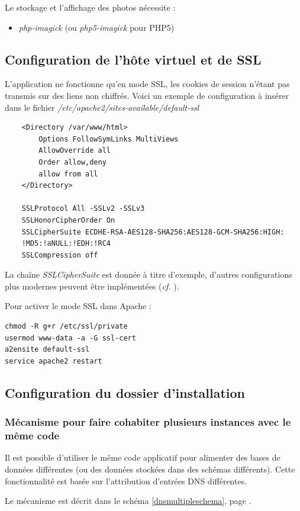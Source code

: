 Le stockage et l'affichage des photos nécessite :
\begin{itemize}
\item \textit{php-imagick} (ou \textit{php5-imagick} pour PHP5)
\end{itemize}

\subsection{Configuration de l'hôte virtuel et de SSL}
L'application ne fonctionne qu'en mode SSL, les cookies de session n'étant pas transmis sur des liens non chiffrés. Voici un exemple de configuration à insérer dans le fichier \textit{/etc/apache2/sites-available/default-ssl}
\begin{lstlisting}
    <Directory /var/www/html>
        Options FollowSymLinks MultiViews
        AllowOverride all
        Order allow,deny
        allow from all
    </Directory>

    SSLProtocol All -SSLv2 -SSLv3
    SSLHonorCipherOrder On
    SSLCipherSuite ECDHE-RSA-AES128-SHA256:AES128-GCM-SHA256:HIGH:
    !MD5:!aNULL:!EDH:!RC4
    SSLCompression off
\end{lstlisting}

La chaîne \textit{SSLCipherSuite} est donnée à titre d'exemple, d'autres configurations plus modernes peuvent être implémentées (\textit{cf.} \cite{tls}).

Pour activer le mode SSL dans Apache :
\begin{lstlisting}
chmod -R g+r /etc/ssl/private
usermod www-data -a -G ssl-cert
a2ensite default-ssl
service apache2 restart
\end{lstlisting}


\subsection{Configuration du dossier d'installation}

\subsubsection{Mécanisme pour faire cohabiter plusieurs instances avec le même code}
\label{dnsmultiple}
Il est possible d'utiliser le même code applicatif pour alimenter des bases de données différentes (ou des données stockées dans des schémas différents). Cette fonctionnalité est basée sur l'attribution d'entrées DNS différentes. 

Le mécanisme est décrit dans le schéma \ref{dnsmultipleschema}, page \pageref{dnsmultipleschema}.

